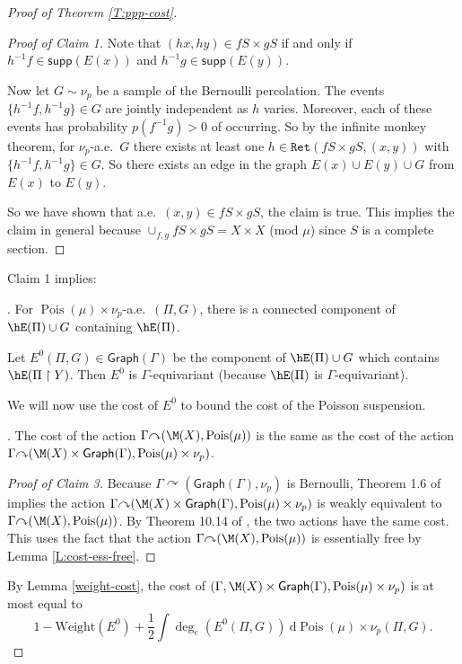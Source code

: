 \documentclass[12pt]{article}
\theoremstyle{plain}
\theoremstyle{definition}
\theoremstyle{remark}
\newcommand{\G}{\Gamma}
\newcommand\Pois{\operatorname{Pois}}
\newcommand\Ret{\mathtt{Ret}}
\def\cc{{\curvearrowright}}
\newcommand{\resto}{\upharpoonright}
\newcommand{\dee}{\textrm{d}}
\begin{document}
\begin{proof}[Proof of Theorem \ref{T:ppp-cost}]
\begin{proof}[Proof of Claim 1]
Note that $(hx,hy)\in fS \times gS$ if and only if  $h^{-1}f \in \mathsf{supp}(E(x))$ and $h^{-1}g \in \mathsf{supp}(E(y))$. 

Now let $G\sim \nu_p$ be a sample of the Bernoulli percolation. The events $\{h^{-1}f, h^{-1}g\} \in G$ are jointly independent as $h$ varies. Moreover, each of these events has probability $p(f^{-1}g)>0$ of occurring. So by the infinite monkey theorem, for $\nu_p$-a.e.\ $G$ there exists at least one $h\in \Ret(fS\times gS, (x,y))$ with $\{h^{-1}f, h^{-1}g\} \in G$. So there exists an edge in the graph $E(x)\cup E(y) \cup G$ from $E(x)$ to $E(y)$. 

So we have shown that a.e.\ $(x,y) \in fS\times gS$, the claim is true. This implies the claim in general because $\cup_{f,g} fS\times gS=X\times X$ (mod $\mu$) since $S$ is a complete section.
\end{proof}



Claim 1 implies:

. %
For $\Pois(\mu)\times \nu_p$-a.e.\ $(\Pi,G)$, there is a connected component of $\hE(\Pi)\cup G$ containing $\hE(\Pi)$.


Let $E^0(\Pi,G) \in \mathsf{Graph}(\G)$ be the component of $\hE(\Pi) \cup G$ which contains $\hE(\Pi \resto Y)$. Then $E^0$ is $\G$-equivariant (because $\hE(\Pi)$ is $\G$-equivariant). 



We will now use the cost of $E^0$ to bound the cost of the Poisson suspension. 

. The cost of the action $\Gamma\cc  (\M(X),\Pois(\mu))$ is the same as the cost of the action $\Gamma\cc  (\M(X)\times \mathsf{Graph}(\G),\Pois(\mu)\times \nu_p)$.


\begin{proof}[Proof of Claim 3]
Because $\G \cc (\mathsf{Graph}(\G),\nu_p)$ is Bernoulli, Theorem 1.6 of \cite{MR3294302} implies the action $\Gamma\cc  (\M(X)\times \mathsf{Graph}(\G),\Pois(\mu)\times \nu_p)$ is weakly equivalent to $\Gamma\cc  (\M(X),\Pois(\mu))$. By Theorem 10.14 of \cite{Kechris-global-aspects}, the two actions have the same cost. This uses the fact that the action $\Gamma\cc  (\M(X),\Pois(\mu))$ is essentially free by Lemma \ref{L:cost-ess-free}. 
\end{proof}

By Lemma \ref{weight-cost}, the cost of $(\Gamma, \M(X)\times \mathsf{Graph}(\G),\Pois(\mu)\times \nu_p)$ is at most equal to
 $$1- \text{Weight}(E^0)+ \frac{1}{2}\int \deg_e(E^0(\Pi,G))~\dee \Pois(\mu)\times \nu_p(\Pi,G).$$
 


\end{proof}
\end{document}
